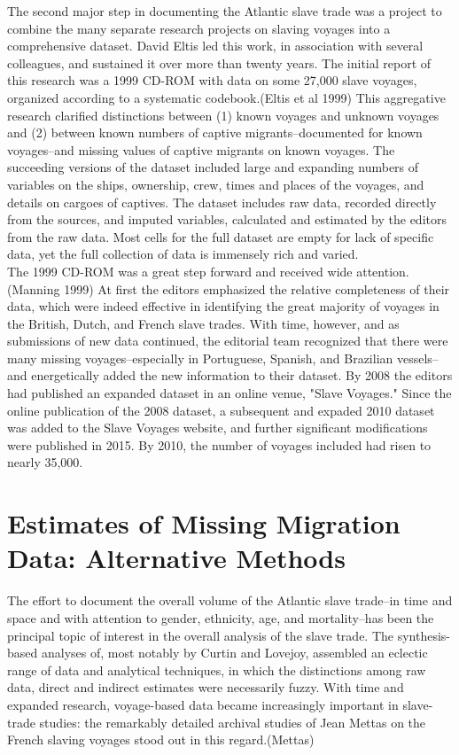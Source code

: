 \documentclass{article}
\begin{document}
The second major step in documenting the Atlantic slave trade was a project to combine the many separate research projects on slaving voyages into a comprehensive dataset. David Eltis led this work, in association with several colleagues, and sustained it over more than twenty years. The initial report of this research was a 1999 CD-ROM with data on some 27,000 slave voyages, organized according to a systematic codebook.(Eltis et al 1999)  This aggregative research clarified distinctions between (1) known voyages and unknown voyages and (2) between known numbers of captive migrants--documented for known voyages--and missing values of captive migrants on known voyages. The succeeding versions of the dataset included large and expanding numbers of variables on the ships, ownership, crew, times and places of the voyages, and details on cargoes of captives. The dataset includes raw data, recorded directly from the sources, and imputed variables, calculated and estimated by the editors from the raw data. Most cells for the full dataset are empty for lack of specific data, yet the full collection of data is immensely rich and varied.\\

The 1999 CD-ROM was a great step forward and received wide attention.(Manning 1999) At first the editors emphasized the relative completeness of their data, which were indeed effective in identifying the great majority of voyages in the British, Dutch, and French slave trades. With time, however, and as submissions of new data continued, the editorial team recognized that there were many missing voyages--especially in Portuguese, Spanish, and Brazilian vessels--and energetically added the new information to their dataset. By 2008 the editors had published an expanded dataset in an online venue, "Slave Voyages." Since the online publication of the 2008 dataset, a subsequent and expaded 2010 dataset was added to the Slave Voyages website, and further significant modifications were published in 2015. By 2010, the number of voyages included had risen to nearly 35,000.\\

\section{Estimates of Missing Migration Data: Alternative Methods}
\label{S:3}
The effort to document the overall volume of the Atlantic slave trade--in time and space and with attention to gender, ethnicity, age, and mortality--has been the principal topic of interest in the overall analysis of the slave trade. The synthesis-based analyses of, most notably by Curtin and Lovejoy, assembled an eclectic range of data and analytical techniques, in which the distinctions among raw data, direct and indirect estimates were necessarily fuzzy. With time and expanded research, voyage-based data became increasingly important in slave-trade studies: the remarkably detailed archival studies of Jean Mettas on the French slaving voyages stood out in this regard.(Mettas) \\
\end{document}
